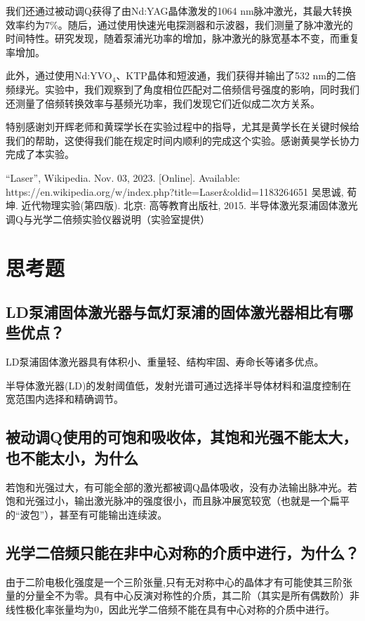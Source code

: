 \documentclass{mpltx}
\begin{document}
我们还通过被动调Q获得了由Nd:YAG晶体激发的1064 nm脉冲激光，其最大转换效率约为7\%。随后，通过使用快速光电探测器和示波器，我们测量了脉冲激光的时间特性。研究发现，随着泵浦光功率的增加，脉冲激光的脉宽基本不变，而重复率增加。

此外，通过使用Nd:YVO$_4$、KTP晶体和短波通，我们获得并输出了532 nm的二倍频绿光。实验中，我们观察到了角度相位匹配对二倍频信号强度的影响，同时我们还测量了倍频转换效率与基频光功率，我们发现它们近似成二次方关系。
\begin{acknowledgments}
特别感谢刘开辉老师和黄琛学长在实验过程中的指导，尤其是黄学长在关键时候给我们的帮助，这使得我们能在规定时间内顺利的完成这个实验。感谢黄昊学长协力完成了本实验。
\end{acknowledgments}

\begin{thebibliography}{}
   “Laser”, Wikipedia. Nov. 03, 2023. [Online]. Available: https://en.wikipedia.org/w/index.php?title=Laser\&oldid=1183264651
   吴思诚, 荀坤. 近代物理实验(第四版). 北京: 高等教育出版社, 2015.
   半导体激光泵浦固体激光调Q与光学二倍频实验仪器说明（实验室提供）
\end{thebibliography}
  
\clearpage %
\appendix %
\section{思考题}
\subsection{LD泵浦固体激光器与氙灯泵浦的固体激光器相比有哪些优点？}
LD泵浦固体激光器具有体积小、重量轻、结构牢固、寿命长等诸多优点。

半导体激光器(LD)的发射阈值低，发射光谱可通过选择半导体材料和温度控制在宽范围内选择和精确调节。
\subsection{被动调Q使用的可饱和吸收体，其饱和光强不能太大，也不能太小，为什么}
若饱和光强过大，有可能全部的激光都被调Q晶体吸收，没有办法输出脉冲光。若饱和光强过小，输出激光脉冲的强度很小，而且脉冲展宽较宽（也就是一个扁平的“波包”），甚至有可能输出连续波。
\subsection{光学二倍频只能在非中心对称的介质中进行，为什么？}
由于二阶电极化强度是一个三阶张量,只有无对称中心的晶体才有可能使其三阶张量的分量全不为零。具有中心反演对称性的介质，其二阶（其实是所有偶数阶）非线性极化率张量均为0，因此光学二倍频不能在具有中心对称的介质中进行。
\end{document}
